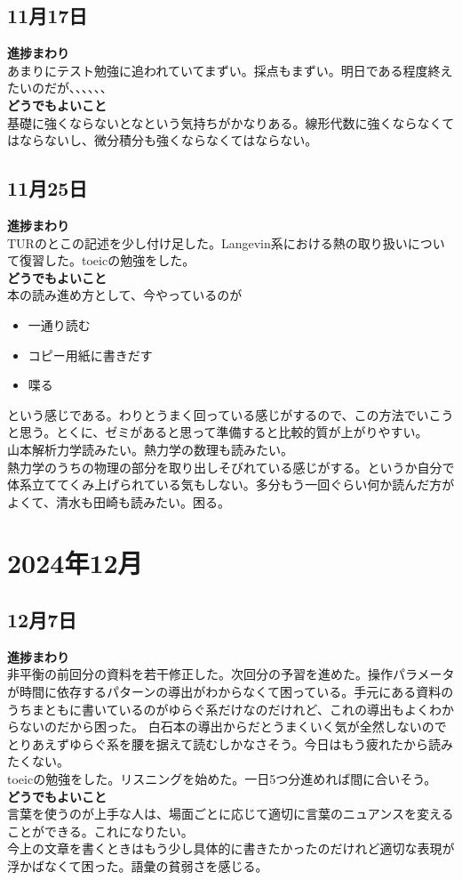 \documentclass[a4paper,11pt]{jsarticle}
\numberwithin{equation}{section}
\begin{document}
\subsection*{11月17日}
\textbf{進捗まわり} \\
あまりにテスト勉強に追われていてまずい。採点もまずい。明日である程度終えたいのだが、、、、、、\\
\textbf{どうでもよいこと} \\
基礎に強くならないとなという気持ちがかなりある。線形代数に強くならなくてはならないし、微分積分も強くならなくてはならない。\\

\subsection*{11月25日}
\textbf{進捗まわり} \\
TURのとこの記述を少し付け足した。Langevin系における熱の取り扱いについて復習した。toeicの勉強をした。\\
\textbf{どうでもよいこと} \\
本の読み進め方として、今やっているのが
\begin{itemize}
  \item 一通り読む
  \item コピー用紙に書きだす
  \item 喋る
\end{itemize}
という感じである。わりとうまく回っている感じがするので、この方法でいこうと思う。とくに、ゼミがあると思って準備すると比較的質が上がりやすい。\\
山本解析力学読みたい。熱力学の数理も読みたい。\\
熱力学のうちの物理の部分を取り出しそびれている感じがする。というか自分で体系立ててくみ上げられている気もしない。多分もう一回ぐらい何か読んだ方がよくて、清水も田崎も読みたい。困る。\\

\section*{2024年12月}
\subsection*{12月7日}
\textbf{進捗まわり} \\
非平衡の前回分の資料を若干修正した。次回分の予習を進めた。操作パラメータが時間に依存するパターンの導出がわからなくて困っている。手元にある資料のうちまともに書いているのがゆらぐ系だけなのだけれど、これの導出もよくわからないのだから困った。
白石本の導出からだとうまくいく気が全然しないのでとりあえずゆらぐ系を腰を据えて読むしかなさそう。今日はもう疲れたから読みたくない。\\

toeicの勉強をした。リスニングを始めた。一日5つ分進めれば間に合いそう。\\

\textbf{どうでもよいこと} \\
言葉を使うのが上手な人は、場面ごとに応じて適切に言葉のニュアンスを変えることができる。これになりたい。\\
今上の文章を書くときはもう少し具体的に書きたかったのだけれど適切な表現が浮かばなくて困った。語彙の貧弱さを感じる。\\
\end{document}
